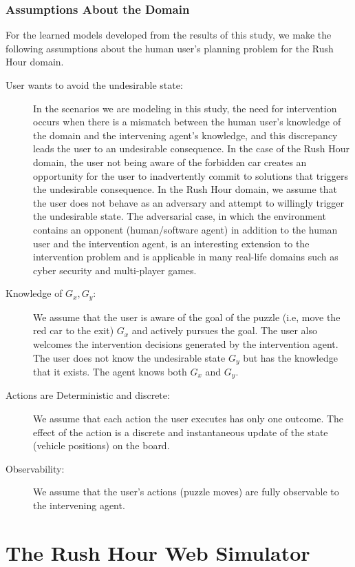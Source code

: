 \documentclass[doctor]{thesis} %
\theoremstyle{plain}
\begin{document}
\subsubsection*{Assumptions About the Domain}
For the learned models developed from the results of this study, we make the following assumptions about the human user's planning problem for the Rush Hour domain.
\begin{description}
\item [User wants to avoid the undesirable state:]
In the scenarios we are modeling in this study, the need for intervention occurs when there is a mismatch between the human user's knowledge of the domain and the intervening agent's knowledge, and this discrepancy leads the user to an undesirable consequence. In the case of the Rush Hour domain, the user not being aware of the forbidden car creates an opportunity for the user to inadvertently commit to solutions that triggers the undesirable consequence. In the Rush Hour domain, we assume that the user does not behave as an adversary and attempt to willingly trigger the undesirable state. The adversarial case, in which  the environment contains an opponent (human/software agent) in addition to the human user and the intervention agent, is an interesting extension to the intervention problem and is applicable in many real-life domains such as cyber security and multi-player games.
\item [Knowledge of $G_x, G_y$:] 
We assume that the user is aware of the goal of the puzzle (i.e, move the red car to the exit) $G_x$ and actively pursues the goal. The user also welcomes the intervention decisions generated by the intervention agent. The user does not know the undesirable state $G_y$ but has the knowledge that it exists. The agent knows both $G_x$ and $G_y$.
\item [Actions are Deterministic and discrete:]
We assume that each action the user executes has only one outcome. The effect of the action is a discrete and instantaneous update of the state (vehicle positions) on the board.
\item [Observability:]
We assume that the user's actions (puzzle moves) are fully observable to the intervening agent.
\end{description}

\section*{The Rush Hour Web Simulator}
\end{document}
